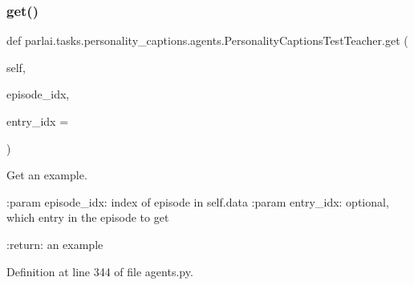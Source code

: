 \subsubsection{\texorpdfstring{get()}{get()}}
{\footnotesize\ttfamily def parlai.\+tasks.\+personality\+\_\+captions.\+agents.\+Personality\+Captions\+Test\+Teacher.\+get (\begin{DoxyParamCaption}\item[{}]{self,  }\item[{}]{episode\+\_\+idx,  }\item[{}]{entry\+\_\+idx = {} }\end{DoxyParamCaption})}

\begin{DoxyVerb}Get an example.

:param episode_idx:
    index of episode in self.data
:param entry_idx:
    optional, which entry in the episode to get

:return:
    an example
\end{DoxyVerb}
 

Definition at line 344 of file agents.\+py.


